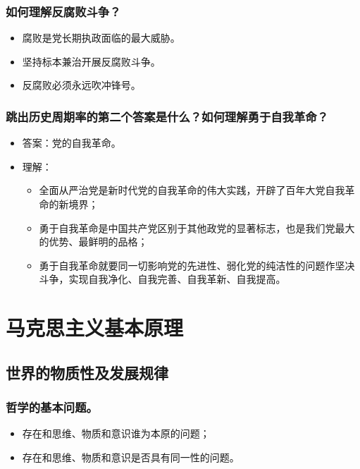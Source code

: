 \documentclass{article}
\begin{document}
\subsubsection{如何理解反腐败斗争？}
\begin{itemize}
    \item 腐败是党长期执政面临的最大威胁。
    \item 坚持标本兼治开展反腐败斗争。
    \item 反腐败必须永远吹冲锋号。
\end{itemize}

\subsubsection{跳出历史周期率的第二个答案是什么？如何理解勇于自我革命？}
\begin{itemize}
    \item 答案：党的自我革命。
    \item 理解：
    \begin{itemize}
        \item 全面从严治党是新时代党的自我革命的伟大实践，开辟了百年大党自我革命的新境界；
        \item 勇于自我革命是中国共产党区别于其他政党的显著标志，也是我们党最大的优势、最鲜明的品格；
        \item 勇于自我革命就要同一切影响党的先进性、弱化党的纯洁性的问题作坚决斗争，实现自我净化、自我完善、自我革新、自我提高。
    \end{itemize}
\end{itemize}

\newpage

\section{马克思主义基本原理}

\subsection{世界的物质性及发展规律}

\subsubsection{哲学的基本问题。}
\begin{itemize}
    \item 存在和思维、物质和意识谁为本原的问题；
    \item 存在和思维、物质和意识是否具有同一性的问题。
\end{itemize}
\end{document}
